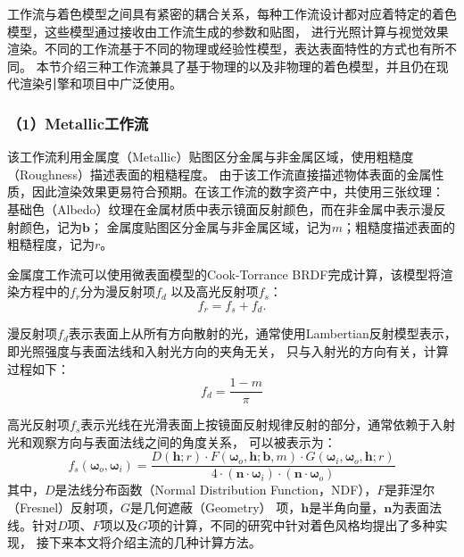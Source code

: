 工作流与着色模型之间具有紧密的耦合关系，每种工作流设计都对应着特定的着色模型，这些模型通过接收由工作流生成的参数和贴图，
进行光照计算与视觉效果渲染。不同的工作流基于不同的物理或经验性模型，表达表面特性的方式也有所不同。
本节介绍三种工作流兼具了基于物理的以及非物理的着色模型，并且仍在现代渲染引擎和项目中广泛使用。

\subsubsection*{（1）Metallic工作流}

该工作流利用金属度（Metallic）贴图区分金属与非金属区域，使用粗糙度（Roughness）描述表面的粗糙程度。
由于该工作流直接描述物体表面的金属性质，因此渲染效果更易符合预期。在该工作流的数字资产中，共使用三张纹理：
基础色（Albedo）纹理在金属材质中表示镜面反射颜色，而在非金属中表示漫反射颜色，记为$\boldsymbol{b}$；
金属度贴图区分金属与非金属区域，记为$m$；粗糙度描述表面的粗糙程度，记为$r$。

金属度工作流可以使用微表面模型的Cook-Torrance BRDF完成计算，该模型将渲染方程中的$f_r$分为漫反射项$f_d$
以及高光反射项$f_s$：
\begin{equation}\label{eq:cook-torrance}
f_r=f_s+f_d.
\end{equation}

漫反射项$f_d$表示表面上从所有方向散射的光，通常使用Lambertian反射模型表示，即光照强度与表面法线和入射光方向的夹角无关，
只与入射光的方向有关，计算过程如下：
\begin{equation}\label{eq:lambertian}
f_d=\frac{1-m}{\pi}
\end{equation}

高光反射项$f_s$表示光线在光滑表面上按镜面反射规律反射的部分，通常依赖于入射光和观察方向与表面法线之间的角度关系，
可以被表示为：
\begin{equation}\label{eq:specular}
f_s({\boldsymbol{\omega}}_o,{\boldsymbol{\omega}}_i)=\frac{D({\boldsymbol{h}};r)\cdot F({\boldsymbol{\omega}}_o,{\boldsymbol{h}};{\boldsymbol{b}},m)\cdot G({\boldsymbol{\omega}}_i,{\boldsymbol{\omega}}_o,{\boldsymbol{h}};r)}
{4\cdot({\boldsymbol{n}}\cdot{\boldsymbol{\omega}}_i)\cdot({\boldsymbol{n}}\cdot{\boldsymbol{\omega}}_o)}
\end{equation}
其中，$D$是法线分布函数（Normal Distribution Function，NDF），$F$是菲涅尔（Fresnel）反射项，$G$是几何遮蔽（Geometry）
项，$\boldsymbol{h}$是半角向量，$\boldsymbol{n}$为表面法线。针对$D$项、$F$项以及$G$项的计算，不同的研究中针对着色风格均提出了多种实现，
接下来本文将介绍主流的几种计算方法。

